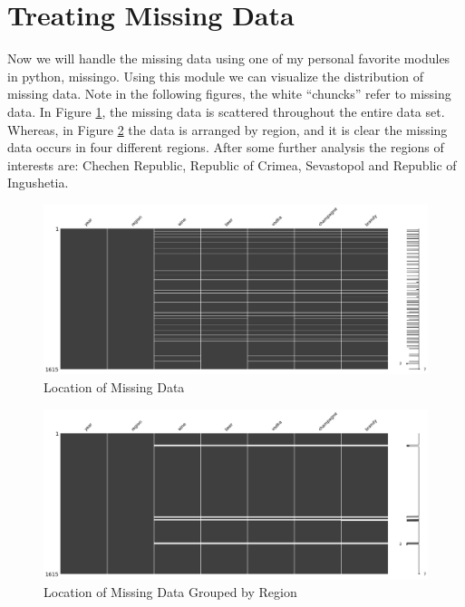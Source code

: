 \documentclass{article}
\begin{document}
\section{Treating Missing Data} Now we will handle the missing data using one of my personal favorite modules in python, missingo. Using this module we can visualize the distribution of missing data. Note in the following figures, the white ``chuncks'' refer to missing data. In Figure \ref{fig:miss_data}, the missing data is scattered throughout the entire data set. Whereas, in Figure \ref{fig:miss_data_region} the data is arranged by region, and it is clear the missing data occurs in four different regions. After some further analysis the regions of interests are: Chechen Republic, Republic of Crimea, Sevastopol and Republic of Ingushetia.

\begin{figure}
    \centering
    \includegraphics[scale = .3]{Missingo/output_7_1.png}
    \caption{Location of Missing Data}
    \label{fig:miss_data}
\end{figure}

\begin{figure}[!htb]
    \centering
    \includegraphics[scale = .3]{Missingo/output_8_1.png}
    \caption{Location of Missing Data Grouped by Region}
    \label{fig:miss_data_region}
\end{figure}
\newpage
\end{document}
